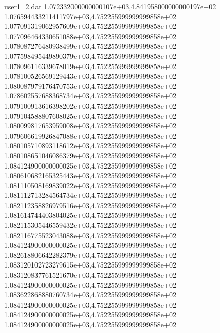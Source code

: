 \begin{filecontents}{user1_2.dat}
1.072332000000000107e+03,4.841958000000000197e+02
1.076594433211411797e+03,4.752255999999999858e+02
1.077091319062957609e+03,4.752255999999999858e+02
1.077096464330651088e+03,4.752255999999999858e+02
1.078087276480938499e+03,4.752255999999999858e+02
1.077598495449890379e+03,4.752255999999999858e+02
1.078096116339678019e+03,4.752255999999999858e+02
1.078100526569129443e+03,4.752255999999999858e+02
1.080087979176470753e+03,4.752255999999999858e+02
1.078602557688368734e+03,4.752255999999999858e+02
1.079100913616398202e+03,4.752255999999999858e+02
1.079104588807608025e+03,4.752255999999999858e+02
1.080099817653959008e+03,4.752255999999999858e+02
1.079606619926847088e+03,4.752255999999999858e+02
1.080105710893118612e+03,4.752255999999999858e+02
1.080108651046086379e+03,4.752255999999999858e+02
1.084124900000000025e+03,4.752255999999999858e+02
1.080610682165325443e+03,4.752255999999999858e+02
1.081110508169839022e+03,4.752255999999999858e+02
1.081112713284564734e+03,4.752255999999999858e+02
1.082112358826979516e+03,4.752255999999999858e+02
1.081614744403804025e+03,4.752255999999999858e+02
1.082115305446559432e+03,4.752255999999999858e+02
1.082116775523043088e+03,4.752255999999999858e+02
1.084124900000000025e+03,4.752255999999999858e+02
1.082618806642282379e+03,4.752255999999999858e+02
1.083120102723279615e+03,4.752255999999999858e+02
1.083120837761521670e+03,4.752255999999999858e+02
1.084124900000000025e+03,4.752255999999999858e+02
1.083622868880760734e+03,4.752255999999999858e+02
1.084124900000000025e+03,4.752255999999999858e+02
1.084124900000000025e+03,4.752255999999999858e+02
1.084124900000000025e+03,4.752255999999999858e+02
\end{filecontents}